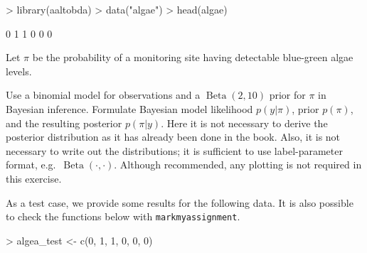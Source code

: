 \documentclass[a4paper,11pt]{article}
\DeclareMathOperator{\Beta}{Beta}
\begin{document}
\begin{Schunk}
\begin{Sinput}
> library(aaltobda)
> data("algae")
> head(algae)
\end{Sinput}
\begin{Soutput}
[1] 0 1 1 0 0 0 
\end{Soutput}
\end{Schunk}

Let $\pi$ be the probability of a monitoring site having detectable
blue-green algae levels.

Use a binomial model for observations and a $\Beta(2,10)$ prior
for $\pi$ in Bayesian inference. Formulate Bayesian model likelihood
$p(y|\pi)$, prior $p(\pi)$, and the resulting posterior $p(\pi|y)$.
Here it is not necessary to derive the posterior distribution as it has already been done in the book.
Also, it is not necessary to write out the distributions; it is sufficient to use label-parameter format, e.g.\ $\Beta(\cdot,\cdot)$. Although recommended, any plotting is not required in this exercise.

As a test case, we provide some results for the following data. It is also possible to check the functions below with \texttt{markmyassignment}.

\begin{Schunk}
\begin{Sinput}
> algea_test <- c(0, 1, 1, 0, 0, 0)
\end{Sinput}
\end{Schunk}

\end{document}
